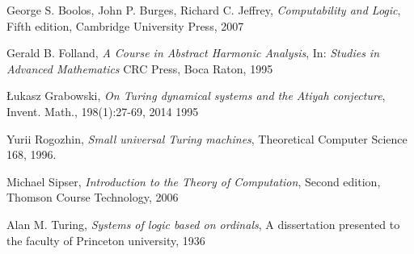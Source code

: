\begin{thebibliography}{1}

	George S. Boolos, John P. Burges, Richard C. Jeffrey,
	\emph{Computability and Logic},
	Fifth edition,
	Cambridge University Press,
	2007

	Gerald B. Folland,
	\emph{A Course in Abstract Harmonic Analysis},
	In: \emph{Studies in Advanced Mathematics}
	CRC Press,
	Boca Raton,
	1995

	\L{}ukasz Grabowski,
	\emph{On Turing dynamical systems and the Atiyah conjecture},
	Invent. Math., 198(1):27-69,
	2014
	1995
	
	Yurii Rogozhin,
	\emph{Small universal Turing machines},
	Theoretical Computer Science 168,
	1996.

	Michael Sipser,
	\emph{Introduction to the Theory of Computation},
	Second edition,
	Thomson Course Technology,
	2006

	Alan M. Turing,
	\emph{Systems of logic based on ordinals},
	A dissertation presented to the faculty of Princeton university,
	1936

\end{thebibliography}
